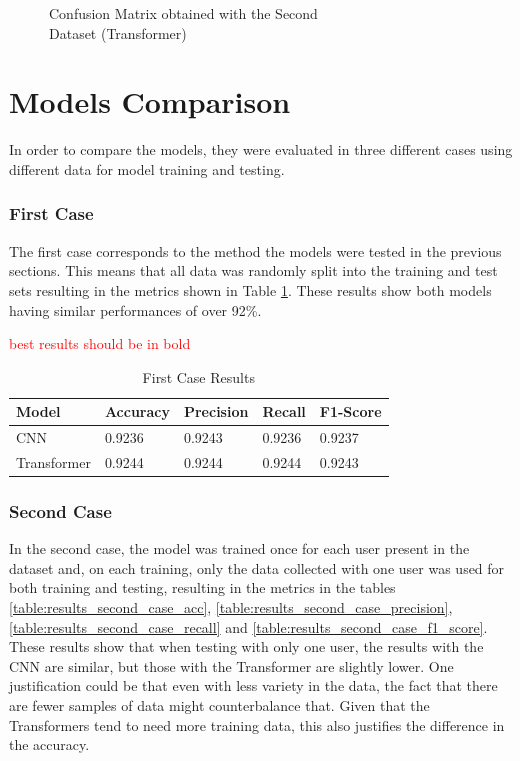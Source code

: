 \begin{figure}[H]
    \centering
    {\fontsize{10}{12}\selectfont}
    \caption[Confusion Matrix obtained with the Second Dataset (Transformer)]{Confusion Matrix obtained with the Second\\Dataset (Transformer)}
    \label{fig:transformer_dataset2_confusion_matrix}
\end{figure}

\section{Models Comparison}

In order to compare the models, they were evaluated in three different cases using different data for model training and testing.

\subsubsection{First Case}

The first case corresponds to the method the models were tested in the previous sections. This means that all data was randomly split into the training and test sets resulting in the metrics shown in Table \ref{table:results_first_case}. These results show both models having similar performances of over 92\%.

\textcolor{red}{best results should be in bold}

\begin{table}[H]
    \centering
    \caption{First Case Results}
    \label{table:results_first_case}
    \begin{tabular}{|l|l|l|l|l|}
        \hline
        Model & Accuracy & Precision & Recall & F1-Score \\
        \hline
        CNN & 0.9236 & 0.9243 & 0.9236 & 0.9237 \\
        \hline
        Transformer & 0.9244 & 0.9244 & 0.9244 & 0.9243 \\
        \hline
    \end{tabular}
\end{table}

\subsubsection{Second Case}

In the second case, the model was trained once for each user present in the dataset and, on each training, only the data collected with one user was used for both training and testing, resulting in the metrics in the tables \ref{table:results_second_case_acc}, \ref{table:results_second_case_precision}, \ref{table:results_second_case_recall} and \ref{table:results_second_case_f1_score}. These results show that when testing with only one user, the results with the CNN are similar, but those with the Transformer are slightly lower. One justification could be that even with less variety in the data, the fact that there are fewer samples of data might counterbalance that. Given that the Transformers tend to need more training data, this also justifies the difference in the accuracy.

